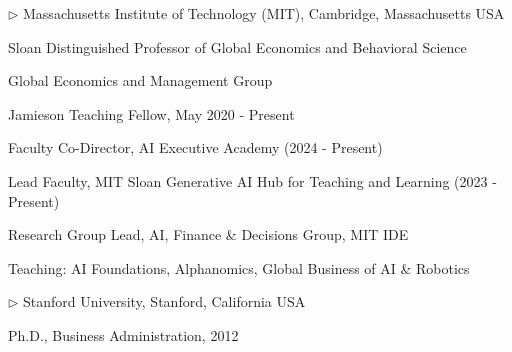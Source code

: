 \documentclass[11pt]{article}
\newenvironment{list1}{
  \begin{list}{\ding{113}}{%
      \setlength{\itemsep}{0in}
      \setlength{\parsep}{0in} \setlength{\parskip}{0in}
      \setlength{\topsep}{0in} \setlength{\partopsep}{0in} 
      \setlength{\leftmargin}{0.17in}}}{\end{list}}
\begin{document}
$\triangleright$ Massachusetts Institute of Technology (MIT), Cambridge, Massachusetts USA\\
\vspace*{-.15in}
\begin{list1}
\item[] Sloan Distinguished Professor of Global Economics and Behavioral Science

\item[] Global Economics and Management Group
\item[] Jamieson Teaching Fellow,  May 2020 - Present
\item[] Faculty Co-Director, AI Executive Academy (2024 - Present)
\item[] Lead Faculty, MIT Sloan Generative AI Hub for Teaching and Learning (2023 - Present)
\item[] Research Group Lead, AI, Finance \& Decisions Group, MIT IDE
\item[] Teaching: AI Foundations, Alphanomics, Global Business of AI \& Robotics
\end{list1}

\vspace*{.1in}
$\triangleright$ Stanford University, Stanford, California USA\\
\vspace*{-.15in}
\begin{list1}
\item[] Ph.D., Business Administration, 2012
\end{list1}
\end{document}
